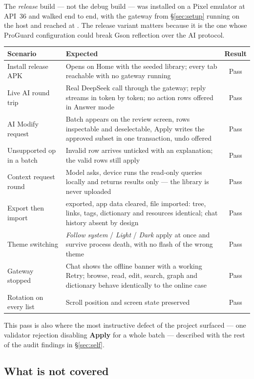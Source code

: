 The \emph{release} build --- not the debug build --- was installed on a Pixel emulator at API~36 and
walked end to end, with the gateway from \S\ref{sec:setup} running on the host and reached at
. The release variant matters because it is the one whose ProGuard configuration
could break Gson reflection over the AI protocol.

\noindent
\begin{tabularx}{\linewidth}{L{3.5cm} X c}
\toprule
\textbf{Scenario} & \textbf{Expected} & \textbf{Result} \\
\midrule
Install release APK & Opens on Home with the seeded library; every tab reachable with no gateway
running & Pass \\
Live AI round trip & Real DeepSeek call through the gateway; reply streams in token by token; no
action rows offered in Answer mode & Pass \\
AI Modify request & Batch appears on the review screen, rows inspectable and deselectable, Apply
writes the approved subset in one transaction, undo offered & Pass \\
Unsupported op in a batch & Invalid row arrives unticked with an explanation; the valid rows still
apply & Pass \\
Context request round & Model asks, device runs the read-only queries locally and returns results
only --- the library is never uploaded & Pass \\
Export then import &  exported, app data cleared, file imported: tree, links, tags,
dictionary and resources identical; chat history absent by design & Pass \\
Theme switching & \emph{Follow system} / \emph{Light} / \emph{Dark} apply at once and survive process
death, with no flash of the wrong theme & Pass \\
Gateway stopped & Chat shows the offline banner with a working Retry; browse, read, edit, search,
graph and dictionary behave identically to the online case & Pass \\
Rotation on every list & Scroll position and screen state preserved & Pass \\
\bottomrule
\end{tabularx}

\medskip
This pass is also where the most instructive defect of the project surfaced --- one validator
rejection disabling \textbf{Apply} for a whole batch --- described with the rest of the audit findings
in \S\ref{sec:self}.

\subsection{What is not covered}

